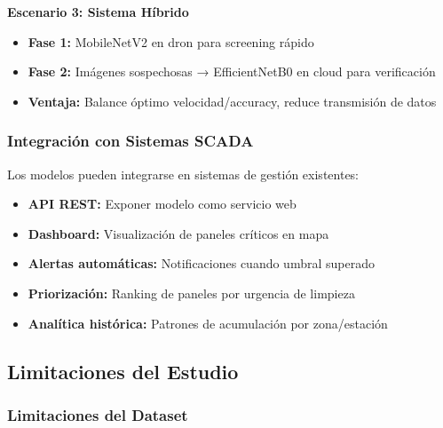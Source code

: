 \documentclass[11pt, a4paper]{article}
\begin{document}
\textbf{Escenario 3: Sistema Híbrido}

\begin{itemize}
    \item \textbf{Fase 1:} MobileNetV2 en dron para screening rápido
    \item \textbf{Fase 2:} Imágenes sospechosas → EfficientNetB0 en cloud para verificación
    \item \textbf{Ventaja:} Balance óptimo velocidad/accuracy, reduce transmisión de datos
\end{itemize}

\subsubsection{Integración con Sistemas SCADA}

Los modelos pueden integrarse en sistemas de gestión existentes:

\begin{itemize}
    \item \textbf{API REST:} Exponer modelo como servicio web
    \item \textbf{Dashboard:} Visualización de paneles críticos en mapa
    \item \textbf{Alertas automáticas:} Notificaciones cuando umbral superado
    \item \textbf{Priorización:} Ranking de paneles por urgencia de limpieza
    \item \textbf{Analítica histórica:} Patrones de acumulación por zona/estación
\end{itemize}

\subsection{Limitaciones del Estudio}

\subsubsection{Limitaciones del Dataset}
\end{document}
